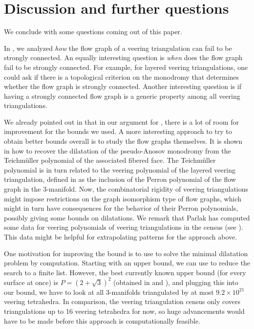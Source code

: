 \documentclass[12pt]{amsart}
\theoremstyle{definition}
\numberwithin{equation}{section}
\begin{document}
\section{Discussion and further questions} \label{sec:questions}

We conclude with some questions coming out of this paper.

In , we analyzed \emph{how} the flow graph of a veering triangulation can fail to be strongly connected. An equally interesting question is \emph{when} does the flow graph fail to be strongly connected. For example, for layered veering triangulations, one could ask if there is a topological criterion on the monodromy that determines whether the flow graph is strongly connected. Another interesting question is if having a strongly connected flow graph is a generic property among all veering triangulations.

We already pointed out in  that in our argument for , there is a lot of room for improvement for the bounds we used. A more interesting approach to try to obtain better bounds overall is to study the flow graphs themselves. It is shown in \cite{McM15} how to recover the dilatation of the pseudo-Anosov monodromy from the Teichm\"uller polynomial of the associated fibered face. The Teichm\"uller polynomial is in turn related to the veering polynomial of the layered veering triangulation, defined in \cite{LMT20} as the inclusion of the Perron polynomial of the flow graph in the 3-manifold. Now, the combinatorial rigidity of veering triangulations might impose restrictions on the graph isomorphism type of flow graphs, which might in turn have consequences for the behavior of their Perron polynomials, possibly giving some bounds on dilatations. We remark that Parlak has computed some data for veering polynomials of veering triangulations in the census (see \cite{Par21}). This data might be helpful for extrapolating patterns for the approach above.

One motivation for improving the bound is to use  to solve the minimal dilatation problem by computation. Starting with an upper bound, we can use  to reduce the search to a finite list. However, the best currently known upper bound (for every surface at once) is $P=(2+\sqrt 3)^2$ (obtained in \cite{HK06} and \cite{Min06}), and plugging this into our bound, we have to look at all 3-manifolds triangulated by at most $9.2 \times 10^{21}$ veering tetrahedra. In comparison, the veering triangulation census only covers triangulations up to 16 veering tetrahedra for now, so huge advancements would have to be made before this approach is computationally feasible.
\end{document}
